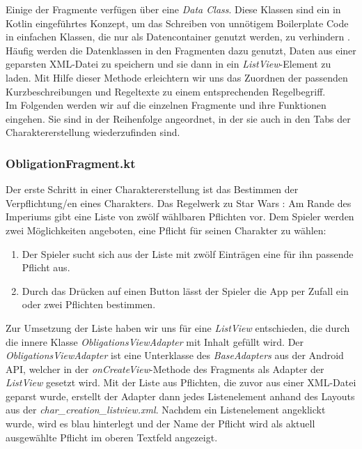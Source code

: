 Einige der Fragmente verfügen über eine \textit{Data Class}. Diese Klassen sind ein in Kotlin eingeführtes Konzept, um das Schreiben von unnötigem \grqq Boilerplate Code\grqq{} in einfachen Klassen, die nur als Datencontainer genutzt werden, zu verhindern \cite{dataclasses}. Häufig werden die Datenklassen in den Fragmenten dazu genutzt, Daten aus einer geparsten XML-Datei zu speichern und sie dann in ein \textit{ListView}-Element zu laden. Mit Hilfe dieser Methode erleichtern wir uns das Zuordnen der passenden Kurzbeschreibungen und Regeltexte zu einem entsprechenden Regelbegriff.\\

Im Folgenden werden wir auf die einzelnen Fragmente und ihre Funktionen eingehen. Sie sind in der Reihenfolge angeordnet, in der sie auch in den Tabs der Charaktererstellung  wiederzufinden sind.

\subsubsection{ObligationFragment.kt}
Der erste Schritt in einer Charaktererstellung ist das Bestimmen der Verpflichtung/en eines Charakters. Das Regelwerk zu \glqq Star Wars : Am Rande des Imperiums\grqq{} \cite[39]{rulebook} gibt eine Liste von zwölf wählbaren Pflichten vor. Dem Spieler werden zwei Möglichkeiten angeboten, eine Pflicht für seinen Charakter zu wählen:
\begin{enumerate}
\item Der Spieler sucht sich aus der Liste mit zwölf Einträgen eine für ihn passende Pflicht aus.
\item Durch das Drücken auf einen Button lässt der Spieler die App per Zufall ein oder zwei Pflichten bestimmen.
\end{enumerate}

Zur Umsetzung der Liste haben wir uns für eine \textit{ListView} entschieden, die durch die innere Klasse \textit{ObligationsViewAdapter} mit Inhalt gefüllt wird. Der \textit{ObligationsViewAdapter} ist eine Unterklasse des \textit{BaseAdapters} aus der Android API, welcher in der \textit{onCreateView}-Methode des Fragments als Adapter der \textit{ListView} gesetzt wird. Mit der Liste aus Pflichten, die zuvor aus einer XML-Datei geparst wurde, erstellt der Adapter dann jedes Listenelement anhand des Layouts aus der \textit{char\_creation\_listview.xml}. Nachdem ein Listenelement angeklickt wurde, wird es blau hinterlegt und der Name der Pflicht wird als aktuell ausgewählte Pflicht im oberen Textfeld angezeigt.\\

